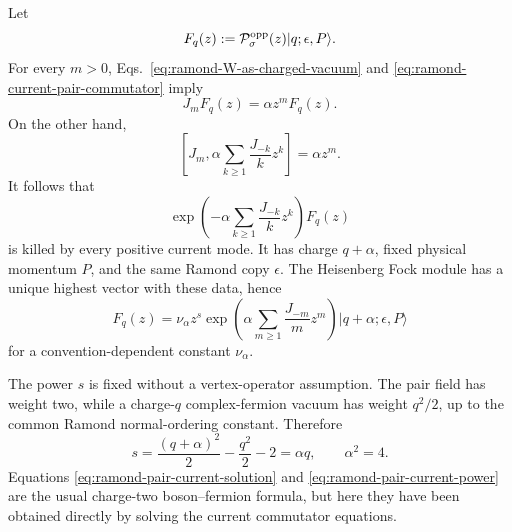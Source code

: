 \documentclass[11pt]{article}
\begin{document}
Let
\begin{equation}
 F_q(z):={\cal P}^{\mathrm{opp}}_\sigma(z)
 |q;\epsilon,P\rangle.
\end{equation}
For every \(m>0\), Eqs.~\eqref{eq:ramond-W-as-charged-vacuum} and
\eqref{eq:ramond-current-pair-commutator} imply
\begin{equation}
 J_mF_q(z)=\alpha z^mF_q(z).
 \label{eq:ramond-current-eigenvector-equations}
\end{equation}
On the other hand,
\begin{equation}
 \left[J_m,
 \alpha\sum_{k\geq1}\frac{J_{-k}}{k}z^k\right]
 =\alpha z^m.
\end{equation}
It follows that
\begin{equation}
 \exp\left(-\alpha\sum_{k\geq1}\frac{J_{-k}}{k}z^k\right)
 F_q(z)
\end{equation}
is killed by every positive current mode.  It has charge \(q+\alpha\),
fixed physical momentum \(P\), and the same Ramond copy \(\epsilon\).  The
Heisenberg Fock module has a unique highest vector with these data, hence
\begin{equation}
 F_q(z)=\nu_\alpha z^s
 \exp\left(\alpha\sum_{m\geq1}\frac{J_{-m}}{m}z^m\right)
 |q+\alpha;\epsilon,P\rangle
 \label{eq:ramond-pair-current-solution}
\end{equation}
for a convention-dependent constant \(\nu_\alpha\).

The power \(s\) is fixed without a vertex-operator assumption.  The pair
field has weight two, while a charge-\(q\) complex-fermion vacuum has weight
\(q^2/2\), up to the common Ramond normal-ordering constant.  Therefore
\begin{equation}
 s=\frac{(q+\alpha)^2}{2}-\frac{q^2}{2}-2
 =\alpha q,
 \qquad \alpha^2=4.
 \label{eq:ramond-pair-current-power}
\end{equation}
Equations \eqref{eq:ramond-pair-current-solution} and
\eqref{eq:ramond-pair-current-power} are the usual charge-two
boson--fermion formula, but here they have been obtained directly by solving
the current commutator equations.
\end{document}
